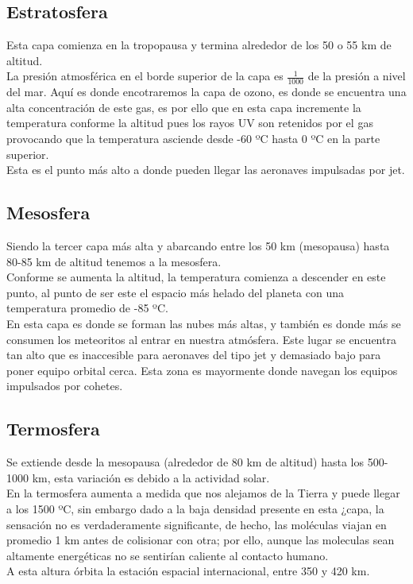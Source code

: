 \subsection{Estratosfera}
Esta capa comienza en la tropopausa y termina alrededor de los 50 o
55 km de altitud.
\\ La presión atmosférica en el borde superior de la capa es
$\frac{1}{1000}$ de la presión a nivel del mar. Aquí es donde
encotraremos la capa de ozono, es donde se encuentra una alta
concentración de este gas, es por ello que en esta capa incremente
la temperatura conforme la altitud pues los rayos UV son retenidos
por el gas provocando que la temperatura asciende desde -60 ºC
hasta 0 ºC en la parte superior.
\\[3mm] Esta es el punto más alto a donde pueden llegar las
aeronaves impulsadas por jet.

\subsection{Mesosfera}
Siendo la tercer capa más alta y abarcando entre los 50 km (mesopausa)         hasta 80-85 km de altitud tenemos a la mesosfera.
\\[3mm] Conforme se aumenta la altitud, la temperatura comienza a
descender en este punto, al punto de ser este el espacio más helado
del planeta con una temperatura promedio de -85 ºC.
\\[3mm] En esta capa es donde se forman las nubes más altas, y también
es donde más se consumen los meteoritos al entrar en nuestra atmósfera. Este lugar se encuentra tan alto que es inaccesible para aeronaves del
tipo jet y demasiado bajo para poner equipo orbital cerca. Esta zona es mayormente donde navegan los equipos impulsados por cohetes.

\subsection{Termosfera}
Se extiende desde la mesopausa (alrededor de 80 km de altitud) hasta
los 500-1000 km, esta variación es debido a la actividad solar.
\\ En la termosfera aumenta a medida que nos alejamos de la Tierra y
puede llegar a los 1500 ºC, sin embargo dado a la baja densidad
presente en esta ¿capa, la sensación no es verdaderamente significante,
de hecho, las moléculas viajan en promedio 1 km antes de colisionar con otra; por ello, aunque las moleculas sean altamente energéticas no se sentirían caliente al  contacto humano.
\\[3mm] A esta altura órbita la estación espacial internacional, entre
350 y 420 km.

